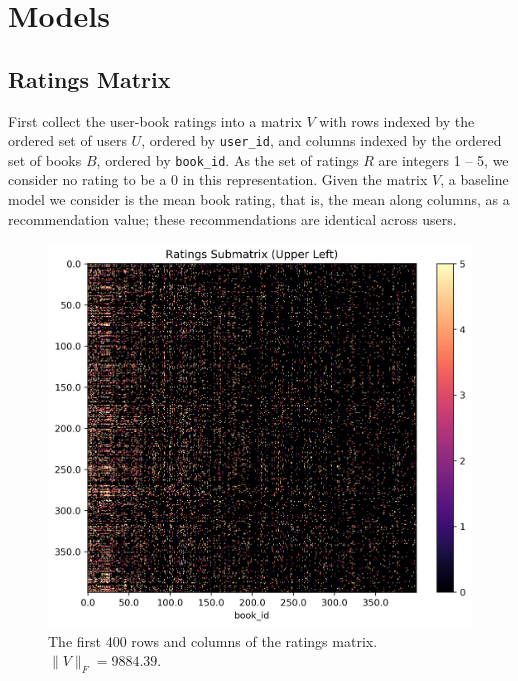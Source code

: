 \documentclass[11pt]{article}
\begin{document}
    \hypertarget{models}{%
\section{Models}\label{models}}
    
    \hypertarget{ratings-matrix}{%
\subsection{Ratings Matrix}\label{ratings-matrix}}


    First collect the user-book ratings into a
matrix \(V\) with rows indexed by the ordered set of users \(U\),
ordered by \texttt{user\_id}, and columns indexed by the ordered set of
books \(B\), ordered by \texttt{book\_id}. As the set of ratings \(R\)
are integers 1 -- 5, we consider no rating to be a 0 in this
representation. Given the matrix \(V\), a baseline model we consider is
the mean book rating, that is, the mean along columns, as a
recommendation value; these recommendations are identical across users.

\begin{figure}
    \centering
    \includegraphics[width=\linewidth]{../image/goodreads-models/ratings-submatrix-upper-left.png}
    \caption[Ratings Submatrix]{The first 400 rows and columns of the ratings matrix. $\|V\|_F = 9884.39$.}
     \label{fig:ratings-submatrix-upper-left}
\end{figure}
\end{document}
